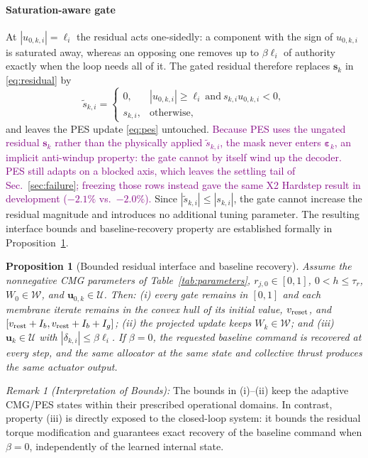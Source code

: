 \documentclass[letterpaper, 10 pt, conference]{ieeeconf}
\newtheorem{proposition}{Proposition}
\begin{document}
\paragraph{Saturation-aware gate}
At $|u_{0,k,i}|=\ell_i$ the residual acts one-sidedly: a component with the sign of $u_{0,k,i}$ is saturated away, whereas an opposing one removes up to $\beta\ell_i$ of authority exactly when the loop needs all of it. The gated residual therefore replaces $\bm s_k$ in \eqref{eq:residual} by
\begin{equation}
 \tilde s_{k,i}=\begin{cases}0,&|u_{0,k,i}|\ge\ell_i\ \text{and}\ s_{k,i}u_{0,k,i}<0,\\ s_{k,i},&\text{otherwise,}\end{cases}
 \label{eq:gate}
\end{equation}
and leaves the PES update \eqref{eq:pes} untouched. \textcolor{purple}{Because PES uses the ungated residual $\bm s_k$ rather than the physically applied $\tilde s_{k,i}$, the mask never enters $\bm\varepsilon_k$, an implicit anti-windup property: the gate cannot by itself wind up the decoder. PES still adapts on a blocked axis, which leaves the settling tail of Sec.~\ref{sec:failure}; freezing those rows instead gave the same X2 Hardstep result in development ($-2.1\%$ vs.\ $-2.0\%$).} Since $|\tilde{s}_{k,i}| \le |s_{k,i}|$, the gate cannot increase
 the residual magnitude and introduces no additional tuning parameter.
 The resulting interface bounds and baseline-recovery property are
 established formally in Proposition~\ref{prop:bounded}.

\begin{proposition}[Bounded residual interface and baseline recovery]\label{prop:bounded}
Assume the nonnegative CMG parameters of Table~\ref{tab:parameters}, $r_{j,0}\in[0,1]$, $0<h\le\tau_r$, $W_0\in\mathcal W$, and $\bm u_{0,k}\in\mathcal U$. Then: (i) every gate remains in $[0,1]$ and each membrane iterate remains in the convex hull of its initial value, $v_{\rm reset}$, and $[v_{\rm rest}+I_b,v_{\rm rest}+I_b+I_g]$; (ii) the projected update keeps $W_k\in\mathcal W$; and (iii) $\bm u_k\in\mathcal U$ with $|\delta_{k,i}|\le\beta\ell_i$. If $\beta=0$, the requested baseline command is recovered at every step, and the same allocator at the same state and collective thrust produces the same actuator output.
\end{proposition}

\textit{Remark 1 (Interpretation of Bounds):}
The bounds in (i)--(ii) keep the adaptive CMG/PES states within their
prescribed operational domains. In contrast, property (iii) is directly
exposed to the closed-loop system: it bounds the residual torque
modification and guarantees exact recovery of the baseline command when
$\beta=0$, independently of the learned internal state.
\end{document}
